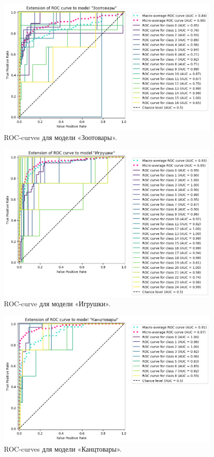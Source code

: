 \documentclass[a4paper,12pt]{extarticle}
\begin{document}
\begin{figure}[hbtp]
	\centering
	\includegraphics[scale=0.7]{roc_curves/roccurve_Зоотовары.png}
	\caption{ROC-curves для модели «Зоотовары».}
	\label{fig:roccurve_Зоотовары}
\end{figure}

\begin{figure}[hbtp]
	\centering
	\includegraphics[scale=0.7]{roc_curves/roccurve_Игрушки.png}
	\caption{ROC-curve для модели «Игрушки».}
	\label{fig:roccurve_Игрушки}
\end{figure}

\begin{figure}[hbtp]
	\centering
	\includegraphics[scale=0.7]{roc_curves/roccurve_Канцтовары.png}
	\caption{ROC-curves для модели «Канцтовары».}
	\label{fig:roccurve_Канцтовары}
\end{figure}
\end{document}

